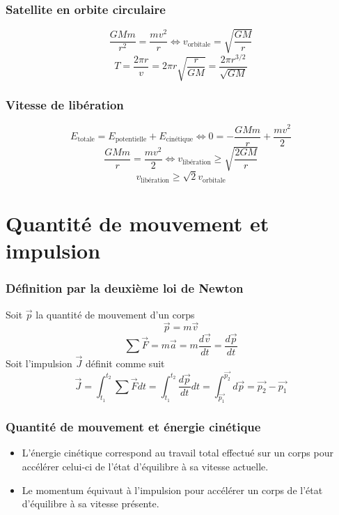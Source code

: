 \section{Satellite en orbite circulaire}
\[ \frac{GMm}{r^2} = \frac{mv^2}{r} \Leftrightarrow v_\mathrm{orbitale} = \sqrt{\frac{GM}{r}} \]
\[ T = \frac{2\pi r}{v} = 2\pi r \sqrt{\frac{r}{GM}} = \frac{2\pi r^{3/2}}{\sqrt{GM}} \]

\section{Vitesse de libération}
\[ E_\mathrm{totale} =
E_\mathrm{potentielle} + E_{\text{cinétique}} \Leftrightarrow 0 = -\frac{GMm}{r} + \frac{mv^2}{2} \]
\[ \frac{GMm}{r} = \frac{mv^2}{2} \Leftrightarrow v_{\text{libération}} \geq \sqrt{\frac{2GM}{r}} \]
\[ v_{\text{libération}} \geq \sqrt{2}v_\mathrm{orbitale} \]

\part{Quantité de mouvement et impulsion}
\section{Définition par la deuxième loi de Newton}
Soit $\vec{p}$ la quantité de mouvement d'un corps
\[\vec{p} = m\vec{v}\]
\[\sum \vec{F} = m\vec{a} = m\frac{d\vec{v}}{dt} = \frac{d\vec{p}}{dt}\]
Soit l'impulsion $\vec{J}$ définit comme suit
\[\vec{J} = \int_{t_1}^{t_2} \sum\vec{F} dt = \int_{t_1}^{t_2}\frac{d\vec{p}}{dt} dt = \int_{\vec{p_1}}^{\vec{p_2}} d\vec{p} = \vec{p_2} - \vec{p_1}\]

\section{Quantité de mouvement et énergie cinétique}
\begin{itemize}
	\item L'énergie cinétique correspond au travail total effectué sur un corps pour accélérer celui-ci de l'état d'équilibre à sa vitesse actuelle.\\
	\item Le momentum équivaut à l'impulsion pour accélérer un corps de l'état d'équilibre à sa vitesse présente.\\
\end{itemize}

